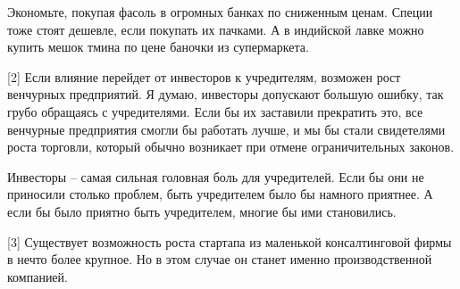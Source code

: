 \documentclass[ebook,12pt,oneside,openany]{memoir}
\begin{document}
Экономьте, покупая фасоль в огромных банках по сниженным ценам. Специи
тоже стоят дешевле, если покупать их пачками. А в индийской лавке
можно купить мешок тмина по цене баночки из супермаркета.

[2] Если влияние перейдет от инвесторов к учредителям, возможен рост
венчурных предприятий. Я думаю, инвесторы допускают большую ошибку,
так грубо обращаясь с учредителями. Если бы их заставили прекратить
это, все венчурные предприятия смогли бы работать лучше, и мы бы стали
свидетелями роста торговли, который обычно возникает при отмене
ограничительных законов.

Инвесторы – самая сильная головная боль для учредителей. Если бы они
не приносили столько проблем, быть учредителем было бы намного
приятнее. А если бы было приятно быть учредителем, многие бы ими
становились.

[3] Существует возможность роста стартапа из маленькой консалтинговой
фирмы в нечто более крупное. Но в этом случае он станет именно
производственной компанией.
\end{document}
